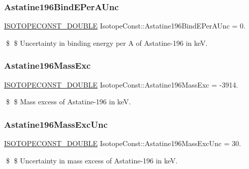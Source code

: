 \subsubsection{\texorpdfstring{Astatine196\+Bind\+E\+Per\+A\+Unc}{Astatine196BindEPerAUnc}}
{\footnotesize\ttfamily \mbox{\hyperlink{group___isotope_const-_macros_ga8f45a7272ce02c0b4c65c44636ed719a}{I\+S\+O\+T\+O\+P\+E\+C\+O\+N\+S\+T\+\_\+\+D\+O\+U\+B\+LE}} Isotope\+Const\+::\+Astatine196\+Bind\+E\+Per\+A\+Unc = 0.}

\$ \$ Uncertainty in binding energy per A of Astatine-\/196 in keV. \mbox{\label{group___isotope_const-_astatine-_at196_ga637a343264fe9157b85055847aaa5ede}} 
\subsubsection{\texorpdfstring{Astatine196\+Mass\+Exc}{Astatine196MassExc}}
{\footnotesize\ttfamily \mbox{\hyperlink{group___isotope_const-_macros_ga8f45a7272ce02c0b4c65c44636ed719a}{I\+S\+O\+T\+O\+P\+E\+C\+O\+N\+S\+T\+\_\+\+D\+O\+U\+B\+LE}} Isotope\+Const\+::\+Astatine196\+Mass\+Exc = -\/3914.}

\$ \$ Mass excess of Astatine-\/196 in keV. \mbox{\label{group___isotope_const-_astatine-_at196_gae85f8bca92a4866c2cf397c8068b198d}} 
\subsubsection{\texorpdfstring{Astatine196\+Mass\+Exc\+Unc}{Astatine196MassExcUnc}}
{\footnotesize\ttfamily \mbox{\hyperlink{group___isotope_const-_macros_ga8f45a7272ce02c0b4c65c44636ed719a}{I\+S\+O\+T\+O\+P\+E\+C\+O\+N\+S\+T\+\_\+\+D\+O\+U\+B\+LE}} Isotope\+Const\+::\+Astatine196\+Mass\+Exc\+Unc = 30.}

\$ \$ Uncertainty in mass excess of Astatine-\/196 in keV. \mbox{\label{group___isotope_const-_astatine-_at196_ga8a5fa8f8fa7bce66db428ac6965ee40f}} 
